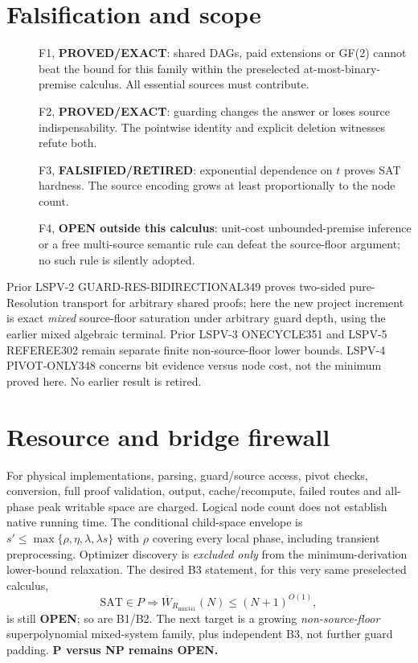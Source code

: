 \documentclass[11pt]{article}
\begin{document}
\section*{Falsification and scope}
\begin{description}
\item[] F1, \textbf{PROVED/EXACT}: shared DAGs, paid extensions or GF(2) cannot beat the bound for this family within the preselected at-most-binary-premise calculus. All essential sources must contribute.
\item[] F2, \textbf{PROVED/EXACT}: guarding changes the answer or loses source indispensability. The pointwise identity and explicit deletion witnesses refute both.
\item[] F3, \textbf{FALSIFIED/RETIRED}: exponential dependence on $t$ proves SAT hardness. The source encoding grows at least proportionally to the node count.
\item[] F4, \textbf{OPEN outside this calculus}: unit-cost unbounded-premise inference or a free multi-source semantic rule can defeat the source-floor argument; no such rule is silently adopted.
\end{description}
Prior LSPV-2 GUARD-RES-BIDIRECTIONAL349 proves two-sided pure-Resolution transport for arbitrary shared proofs; here the new project increment is exact \emph{mixed} source-floor saturation under arbitrary guard depth, using the earlier mixed algebraic terminal. Prior LSPV-3 ONECYCLE351 and LSPV-5 REFEREE302 remain separate finite non-source-floor lower bounds. LSPV-4 PIVOT-ONLY348 concerns bit evidence versus node cost, not the minimum proved here. No earlier result is retired.
\section*{Resource and bridge firewall}
For physical implementations, parsing, guard/source access, pivot checks, conversion, full proof validation, output, cache/recompute, failed routes and all-phase peak writable space are charged. Logical node count does not establish native running time. The conditional child-space envelope is $s'\le\max\{\rho,\eta,\lambda,\lambda s\}$ with $\rho$ covering every local phase, including transient preprocessing. Optimizer discovery is \emph{excluded only} from the minimum-derivation lower-bound relaxation. The desired B3 statement, for this very same preselected calculus,
\[
 \mathrm{SAT}\in P\Longrightarrow \overline W_{R_{\mathrm{mix341}}}(N)\le(N+1)^{O(1)},
\]
is still \textbf{OPEN}; so are B1/B2. The next target is a growing \emph{non-source-floor} superpolynomial mixed-system family, plus independent B3, not further guard padding. \textbf{P versus NP remains OPEN.}
\end{document}
